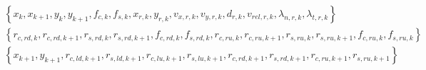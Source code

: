 \begin{subequations}
\begin{align}
        & \left\{ x_{k}, x_{k+1}, y_{k}, y_{k+1}, f_{c, k}, f_{s, k}, x_{r, k}, y_{r, k}, v_{x, r, k}, v_{y, r, k}, d_{r, k}, v_{rel, r, k}, \lambda_{n, r, k}, \lambda_{t, r, k} \right\} \\ 
        & \left\{ r_{c, rd, k}, r_{c, rd, k+1}, r_{s, rd, k}, r_{s, rd, k+1}, f_{c, rd, k}, f_{s, rd, k}, r_{c, ru, k}, r_{c, ru, k+1}, r_{s, ru, k}, r_{s, ru, k+1}, f_{c, ru, k}, f_{s, ru, k} \right\} \\ 
        & \left\{ x_{k+1}, y_{k+1}, r_{c, ld, k+1}, r_{s, ld, k+1}, r_{c, lu, k+1}, r_{s, lu, k+1}, r_{c, rd, k+1}, r_{s, rd, k+1}, r_{c, ru, k+1}, r_{s, ru, k+1} \right\}
     \end{align}
\end{subequations}
